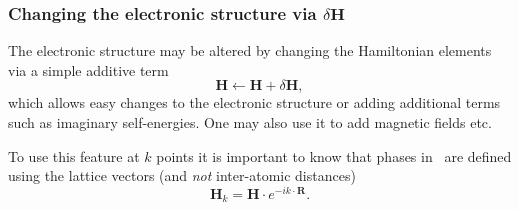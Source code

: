 \subsubsection{Changing the electronic structure via
    \texorpdfstring{$\delta\mathbf H$}{dH}}

The electronic structure may be altered by changing the Hamiltonian
elements via a simple additive term
\begin{equation}
  \mathbf H \leftarrow \mathbf H + \delta\mathbf H,
\end{equation}
which allows easy changes to the electronic structure or adding
additional terms such as imaginary self-energies. One may also use it
to add magnetic fields etc.

To use this feature at $k$ points it is important to know that phases
in \tbtrans\ are defined using the lattice vectors (and \emph{not}
inter-atomic distances)
\begin{equation}
  \mathbf H_k = \mathbf H \cdot e^{-i k \cdot \mathbf R}.
\end{equation}

